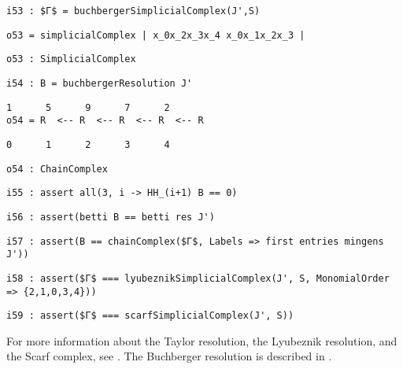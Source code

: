 \documentclass[12pt,leqno]{amsart}
\theoremstyle{definition}
\begin{document}
\begin{lstlisting}[xleftmargin=10pt, aboveskip=1.5pt, belowskip=1.5pt]
i53 : $Γ$ = buchbergerSimplicialComplex(J',S)
\end{lstlisting}
\begin{lstlisting}[xleftmargin=10pt, aboveskip=1.5pt, belowskip=1.5pt]
o53 = simplicialComplex | x_0x_2x_3x_4 x_0x_1x_2x_3 |
\end{lstlisting}
\begin{lstlisting}[xleftmargin=10pt, aboveskip=1.5pt, belowskip=1.5pt]
o53 : SimplicialComplex
\end{lstlisting}
\begin{lstlisting}[xleftmargin=10pt, aboveskip=1.5pt, belowskip=1.5pt]
i54 : B = buchbergerResolution J'
\end{lstlisting}
\begin{lstlisting}[xleftmargin=10pt, lineskip=-10pt, aboveskip=1.5pt, belowskip=1.5pt]
       1      5      9      7      2
o54 = R  <-- R  <-- R  <-- R  <-- R
\end{lstlisting}
\begin{lstlisting}[xleftmargin=10pt, aboveskip=1.5pt, belowskip=1.5pt]
      0      1      2      3      4
\end{lstlisting}
\begin{lstlisting}[xleftmargin=10pt, aboveskip=1.5pt, belowskip=1.5pt]
o54 : ChainComplex
\end{lstlisting}
\begin{lstlisting}[xleftmargin=10pt, aboveskip=1.5pt, belowskip=1.5pt]
i55 : assert all(3, i -> HH_(i+1) B == 0) 
\end{lstlisting}
\begin{lstlisting}[xleftmargin=10pt, aboveskip=1.5pt, belowskip=1.5pt]
i56 : assert(betti B == betti res J')
\end{lstlisting}
\begin{lstlisting}[xleftmargin=10pt, aboveskip=1.5pt, belowskip=1.5pt]
i57 : assert(B == chainComplex($Γ$, Labels => first entries mingens J'))
\end{lstlisting}
\begin{lstlisting}[xleftmargin=10pt, aboveskip=1.5pt, belowskip=1.5pt]
i58 : assert($Γ$ === lyubeznikSimplicialComplex(J', S, MonomialOrder => {2,1,0,3,4}))
\end{lstlisting}
\begin{lstlisting}[xleftmargin=10pt, aboveskip=1.5pt, belowskip=3.0pt]
i59 : assert($Γ$ === scarfSimplicialComplex(J', S))
\end{lstlisting}
For more information about the Taylor resolution, the Lyubeznik resolution,
and the Scarf complex, see \cite{Mermin}.  The Buchberger resolution is
described in \cite{OW}.  
\end{document}
